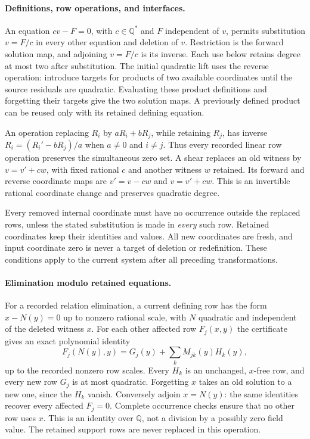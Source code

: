 \documentclass[11pt]{article}
\theoremstyle{definition}
\theoremstyle{remark}
\newcommand{\Q}{\mathbb Q}
\begin{document}
\paragraph{Definitions, row operations, and interfaces.}
An equation $cv-F=0$, with $c\in\Q^*$ and $F$ independent of $v$,
permits substitution $v=F/c$ in every other equation and deletion of $v$.
Restriction is the forward solution map, and adjoining $v=F/c$ is its
inverse. Each use below retains degree at most two after substitution.
The initial quadratic lift uses the reverse operation: introduce targets
for products of two available coordinates until the source residuals are
quadratic. Evaluating these product definitions and forgetting their
targets give the two solution maps. A previously defined product can be
reused only with its retained defining equation.

An operation replacing $R_i$ by $aR_i+bR_j$, while retaining $R_j$,
has inverse $R_i=(R_i'-bR_j)/a$ when $a\ne0$ and $i\ne j$.
Thus every recorded linear row operation preserves the simultaneous zero
set. A shear replaces an old witness by $v=v'+cw$, with fixed rational
$c$ and another witness $w$ retained. Its forward and reverse coordinate
maps are $v'=v-cw$ and $v=v'+cw$. This is an invertible rational coordinate
change and preserves quadratic degree.

Every removed internal coordinate must have no occurrence outside the
replaced rows, unless the stated substitution is made in \emph{every}
such row. Retained coordinates keep their identities and values. All new
coordinates are fresh, and input coordinate zero is never a target of
deletion or redefinition. These conditions apply to the current system
after all preceding transformations.
\paragraph{Elimination modulo retained equations.}
For a recorded relation elimination, a current defining row has the form
$x-N(y)=0$ up to nonzero rational scale, with $N$ quadratic and independent
of the deleted witness $x$. For each other affected row $F_j(x,y)$ the
certificate gives an exact polynomial identity
\[
 F_j(N(y),y)=G_j(y)+\sum_k M_{jk}(y)H_k(y),
\]
up to the recorded nonzero row scales. Every $H_k$ is an unchanged,
$x$-free row, and every new row $G_j$ is at most quadratic. Forgetting
$x$ takes an old solution to a new one, since the $H_k$ vanish.
Conversely adjoin $x=N(y)$: the same identities recover every affected
$F_j=0$. Complete occurrence checks ensure that no other row uses $x$.
This is an identity over $\Q$, not a division by a possibly zero field
value. The retained support rows are never replaced in this operation.
\end{document}

